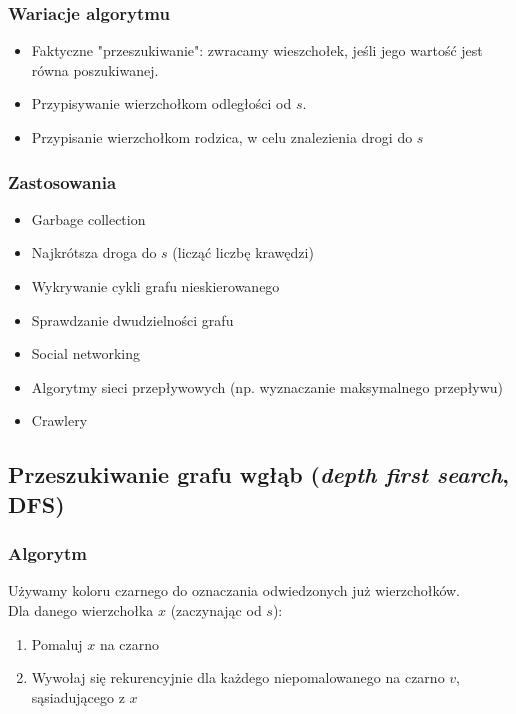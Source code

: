 \documentclass[12pt]{article}
\begin{document}
    \subsubsection{Wariacje algorytmu}

    \begin{itemize}
        \item Faktyczne "przeszukiwanie": zwracamy wieszchołek, jeśli jego wartość jest
        równa poszukiwanej.
        \item Przypisywanie wierzchołkom odległości od $s$.
        \item Przypisanie wierzchołkom rodzica, w celu znalezienia drogi do $s$
    \end{itemize}

    \subsubsection{Zastosowania}

    \begin{itemize}
        \item Garbage collection
        \item Najkrótsza droga do $s$ (licząć liczbę krawędzi)
        \item Wykrywanie cykli grafu nieskierowanego
        \item Sprawdzanie dwudzielności grafu
        \item Social networking
        \item Algorytmy sieci przepływowych (np. wyznaczanie maksymalnego przepływu)
        \item Crawlery
    \end{itemize}

    \subsection{Przeszukiwanie grafu wgłąb (\textit{depth first search}, DFS)}

    \subsubsection{Algorytm}

    Używamy koloru czarnego do oznaczania odwiedzonych już wierzchołków.\[\]
    Dla danego wierzchołka $x$ (zaczynając od $s$):
    \begin{enumerate}
        \item Pomaluj $x$ na czarno
        \item Wywołaj się rekurencyjnie dla każdego niepomalowanego na czarno $v$,
        sąsiadującego z $x$
    \end{enumerate}
\end{document}
